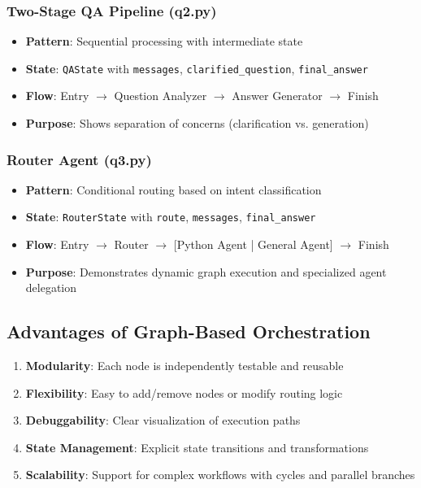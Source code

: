 \documentclass[11pt]{article}
\begin{document}
\subsubsection{Two-Stage QA Pipeline (q2.py)}
\begin{itemize}[leftmargin=2em]
    \item \textbf{Pattern}: Sequential processing with intermediate state
    \item \textbf{State}: \texttt{QAState} with \texttt{messages}, \texttt{clarified\_question}, \texttt{final\_answer}
    \item \textbf{Flow}: Entry $\rightarrow$ Question Analyzer $\rightarrow$ Answer Generator $\rightarrow$ Finish
    \item \textbf{Purpose}: Shows separation of concerns (clarification vs. generation)
\end{itemize}

\subsubsection{Router Agent (q3.py)}
\begin{itemize}[leftmargin=2em]
    \item \textbf{Pattern}: Conditional routing based on intent classification
    \item \textbf{State}: \texttt{RouterState} with \texttt{route}, \texttt{messages}, \texttt{final\_answer}
    \item \textbf{Flow}: Entry $\rightarrow$ Router $\rightarrow$ [Python Agent | General Agent] $\rightarrow$ Finish
    \item \textbf{Purpose}: Demonstrates dynamic graph execution and specialized agent delegation
\end{itemize}

\subsection{Advantages of Graph-Based Orchestration}
\begin{enumerate}[leftmargin=2em]
    \item \textbf{Modularity}: Each node is independently testable and reusable
    \item \textbf{Flexibility}: Easy to add/remove nodes or modify routing logic
    \item \textbf{Debuggability}: Clear visualization of execution paths
    \item \textbf{State Management}: Explicit state transitions and transformations
    \item \textbf{Scalability}: Support for complex workflows with cycles and parallel branches
\end{enumerate}
\end{document}

